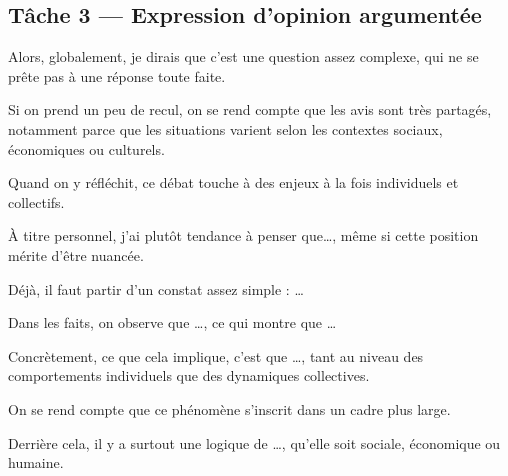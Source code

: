 \documentclass[12pt,a4paper]{article}
\begin{document}
\subsection{Tâche 3 — Expression d'opinion argumentée}

\begin{tcolorbox}[title=\textbf{ÉTAPE 1 · Cadrage du débat + position ($\approx$ 45 s)}]
Alors, globalement, je dirais que c'est une question assez complexe, qui ne se prête pas à une réponse toute faite.

Si on prend un peu de recul, on se rend compte que les avis sont très partagés, notamment parce que les situations varient selon les contextes sociaux, économiques ou culturels.

Quand on y réfléchit, ce débat touche à des enjeux à la fois individuels et collectifs.

À titre personnel, j'ai plutôt tendance à penser que…, même si cette position mérite d'être nuancée.
\end{tcolorbox}

\begin{tcolorbox}[title=\textbf{ÉTAPE 2 · Axe principal : analyse en profondeur ($\approx$ 1 min 30)}]
Déjà, il faut partir d'un constat assez simple : …

Dans les faits, on observe que …, ce qui montre que …

Concrètement, ce que cela implique, c'est que …, tant au niveau des comportements individuels que des dynamiques collectives.

On se rend compte que ce phénomène s'inscrit dans un cadre plus large.

Derrière cela, il y a surtout une logique de …, qu'elle soit sociale, économique ou humaine.
\end{tcolorbox}
\end{document}
